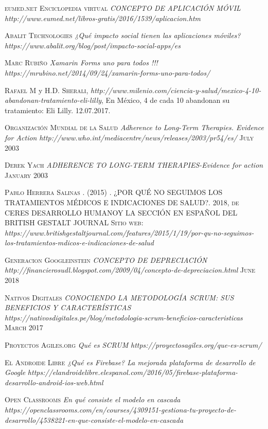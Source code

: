 \begin{thebibliography}{X}
	 \textsc{eumed.net Enciclopedia virtual} \textit{CONCEPTO DE APLICACIÓN MÓVIL} \textit{http://www.eumed.net/libros-gratis/2016/1539/aplicacion.htm}
	
	 \textsc{Abalit Technologies} \textit{¿Qué impacto social tienen las aplicaciones móviles?} \textit{https://www.abalit.org/blog/post/impacto-social-apps/es}
	
	 \textsc{Marc Rubiño} \textit{Xamarin Forms uno para todos !!!} \textit{https://mrubino.net/2014/09/24/xamarin-forms-uno-para-todos/}
	
	 \textsc{Rafael M} y \textsc{H.D. Sherali},
	\textit{http://www.milenio.com/ciencia-y-salud/mexico-4-10-abandonan-tratamiento-eli-lilly},  En México, 4 de cada 10 abandonan su tratamiento: Eli Lilly. 12.07.2017.
	
	 \textsc{Organización Mundial de la Salud} \textit{Adherence to Long-Term Therapies. Evidence for Action} \textit{http://www.who.int/mediacentre/news/releases/2003/pr54/es/} \textsc{July 2003}
	
	 \textsc{Derek Yach} \textit{ADHERENCE TO LONG-TERM THERAPIES-Evidence for action
} \textsc{January 2003}
	
	 \textsc{Pablo Herrera Salinas . (2015)} \textsc{. ¿POR QUÉ NO SEGUIMOS LOS TRATAMIENTOS MÉDICOS E INDICACIONES DE SALUD?. 2018, de CERES DESARROLLO HUMANOY LA SECCIÓN EN ESPAÑOL DEL BRITISH GESTALT JOURNAL Sitio web:} \textit{https://www.britishgestaltjournal.com/features/2015/1/19/por-qu-no-seguimos-los-tratamientos-mdicos-e-indicaciones-de-salud}

	 \textsc{Generacion Googleinstein} \textit{CONCEPTO DE DEPRECIACIÓN} \textit{http://financierosudl.blogspot.com/2009/04/concepto-de-depreciacion.html} \textsc{June 2018}
	
	 \textsc{Nativos Digitales} \textit{CONOCIENDO LA METODOLOGÍA SCRUM: SUS BENEFICIOS Y CARACTERÍSTICAS} \textit{https://nativosdigitales.pe/blog/metodologia-scrum-beneficios-caracteristicas} \textsc{March 2017}
	
	 \textsc{Proyectos Agiles.org} \textit{Qué es SCRUM} \textit{https://proyectosagiles.org/que-es-scrum/} 
	
	 \textsc{El Androide Libre} \textit{¿Qué es Firebase? La mejorada plataforma de desarrollo de Google} \textit{https://elandroidelibre.elespanol.com/2016/05/firebase-plataforma-desarrollo-android-ios-web.html} 
	
	 \textsc{Open Classrooms} \textit{En qué consiste el modelo en cascada} \textit{https://openclassrooms.com/en/courses/4309151-gestiona-tu-proyecto-de-desarrollo/4538221-en-que-consiste-el-modelo-en-cascada} 
	
	
		 
	
	 
\end{thebibliography}